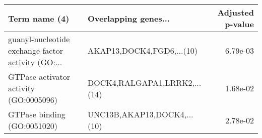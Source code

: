 \begin{tabular}{llr}
\toprule
                                     Term name (4) &         Overlapping genes... &  Adjusted p-value \\
\midrule
guanyl-nucleotide exchange factor activity (GO:... &    AKAP13,DOCK4,FGD6,...(10) &          6.79e-03 \\
            GTPase activator activity (GO:0005096) & DOCK4,RALGAPA1,LRRK2,...(14) &          1.68e-02 \\
                       GTPase binding (GO:0051020) &  UNC13B,AKAP13,DOCK4,...(10) &          2.78e-02 \\
\bottomrule
\end{tabular}
